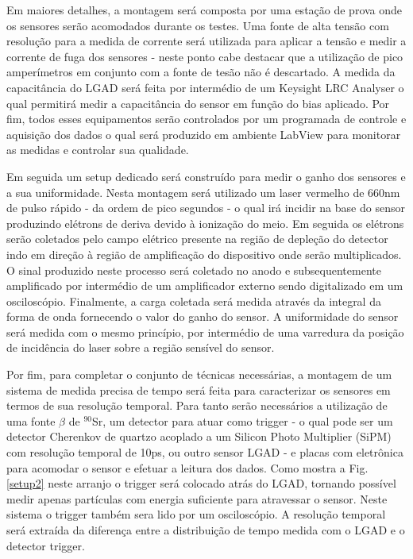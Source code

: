 Em maiores detalhes, a montagem será composta por uma estação de prova onde os sensores serão acomodados durante os testes. Uma fonte de alta tensão com resolução para a medida de corrente será utilizada para aplicar a tensão e medir a corrente de fuga dos sensores - neste ponto cabe destacar que a utilização de pico amperímetros em conjunto com a fonte de tesão não é descartado. A medida da capacitância do LGAD será feita por intermédio de um Keysight LRC Analyser o qual permitirá medir a capacitância do sensor em função do bias aplicado. Por fim, todos esses equipamentos serão controlados por um programada de controle e aquisição dos dados o qual será produzido em ambiente LabView para monitorar as medidas e controlar sua qualidade.

Em seguida um setup dedicado será construído para medir o ganho dos sensores e a sua uniformidade. Nesta montagem será utilizado um laser vermelho de 660nm de pulso rápido - da ordem de pico segundos - o qual irá incidir na base do sensor produzindo elétrons de deriva devido à ionização do meio. Em seguida os elétrons serão coletados pelo campo elétrico presente na região de depleção do detector indo em direção à região de amplificação do dispositivo onde serão multiplicados. O sinal produzido neste processo será coletado no anodo e subsequentemente amplificado por intermédio de um amplificador externo sendo digitalizado em um osciloscópio. Finalmente, a carga coletada será medida através da integral da forma de onda fornecendo o valor do ganho do sensor. A uniformidade do sensor será medida com o mesmo princípio, por intermédio de uma varredura da posição de incidência do laser sobre a região sensível do sensor.

Por fim, para completar o conjunto de técnicas necessárias, a montagem de um sistema de medida precisa de tempo será feita para caracterizar os sensores em termos de sua resolução temporal. Para tanto serão necessários a utilização de uma fonte $\beta$ de $^{90}$Sr, um detector para atuar como trigger - o qual pode ser um detector Cherenkov de quartzo acoplado a um Silicon Photo Multiplier (SiPM) com resolução temporal de 10ps, ou outro sensor LGAD - e placas com eletrônica para acomodar o sensor e efetuar a leitura dos dados. Como mostra a Fig. \ref{setup2} neste arranjo o trigger será colocado atrás do LGAD, tornando possível medir apenas partículas com energia suficiente para atravessar o sensor. Neste sistema o trigger também sera lido por um osciloscópio. A resolução temporal será extraída da diferença entre a distribuição de tempo medida com o LGAD e o detector trigger.

